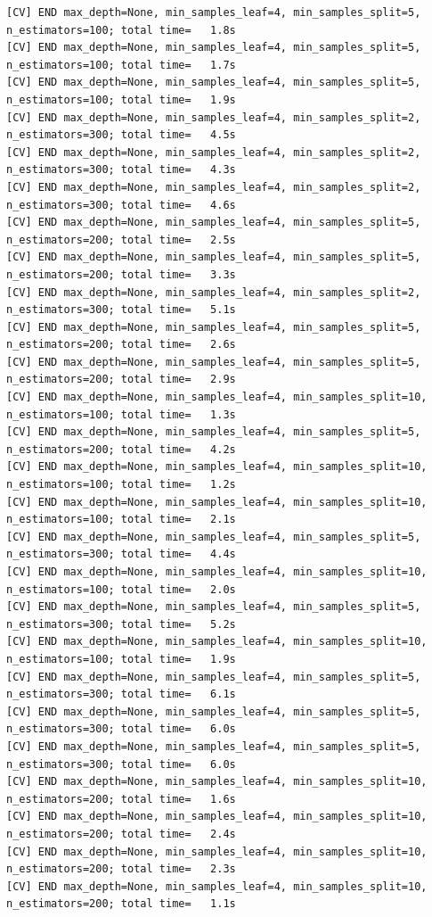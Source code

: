 \documentclass[
  11pt,
  letterpaper,
  DIV=11,
  numbers=noendperiod]{scrartcl}
\begin{document}
\begin{verbatim}
[CV] END max_depth=None, min_samples_leaf=4, min_samples_split=5, n_estimators=100; total time=   1.8s
[CV] END max_depth=None, min_samples_leaf=4, min_samples_split=5, n_estimators=100; total time=   1.7s
[CV] END max_depth=None, min_samples_leaf=4, min_samples_split=5, n_estimators=100; total time=   1.9s
[CV] END max_depth=None, min_samples_leaf=4, min_samples_split=2, n_estimators=300; total time=   4.5s
[CV] END max_depth=None, min_samples_leaf=4, min_samples_split=2, n_estimators=300; total time=   4.3s
[CV] END max_depth=None, min_samples_leaf=4, min_samples_split=2, n_estimators=300; total time=   4.6s
[CV] END max_depth=None, min_samples_leaf=4, min_samples_split=5, n_estimators=200; total time=   2.5s
[CV] END max_depth=None, min_samples_leaf=4, min_samples_split=5, n_estimators=200; total time=   3.3s
[CV] END max_depth=None, min_samples_leaf=4, min_samples_split=2, n_estimators=300; total time=   5.1s
[CV] END max_depth=None, min_samples_leaf=4, min_samples_split=5, n_estimators=200; total time=   2.6s
[CV] END max_depth=None, min_samples_leaf=4, min_samples_split=5, n_estimators=200; total time=   2.9s
[CV] END max_depth=None, min_samples_leaf=4, min_samples_split=10, n_estimators=100; total time=   1.3s
[CV] END max_depth=None, min_samples_leaf=4, min_samples_split=5, n_estimators=200; total time=   4.2s
[CV] END max_depth=None, min_samples_leaf=4, min_samples_split=10, n_estimators=100; total time=   1.2s
[CV] END max_depth=None, min_samples_leaf=4, min_samples_split=10, n_estimators=100; total time=   2.1s
[CV] END max_depth=None, min_samples_leaf=4, min_samples_split=5, n_estimators=300; total time=   4.4s
[CV] END max_depth=None, min_samples_leaf=4, min_samples_split=10, n_estimators=100; total time=   2.0s
[CV] END max_depth=None, min_samples_leaf=4, min_samples_split=5, n_estimators=300; total time=   5.2s
[CV] END max_depth=None, min_samples_leaf=4, min_samples_split=10, n_estimators=100; total time=   1.9s
[CV] END max_depth=None, min_samples_leaf=4, min_samples_split=5, n_estimators=300; total time=   6.1s
[CV] END max_depth=None, min_samples_leaf=4, min_samples_split=5, n_estimators=300; total time=   6.0s
[CV] END max_depth=None, min_samples_leaf=4, min_samples_split=5, n_estimators=300; total time=   6.0s
[CV] END max_depth=None, min_samples_leaf=4, min_samples_split=10, n_estimators=200; total time=   1.6s
[CV] END max_depth=None, min_samples_leaf=4, min_samples_split=10, n_estimators=200; total time=   2.4s
[CV] END max_depth=None, min_samples_leaf=4, min_samples_split=10, n_estimators=200; total time=   2.3s
[CV] END max_depth=None, min_samples_leaf=4, min_samples_split=10, n_estimators=200; total time=   1.1s

\end{verbatim}
\end{document}
